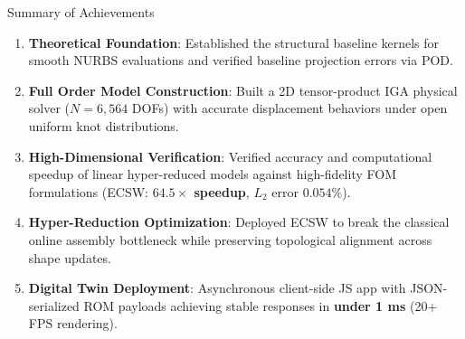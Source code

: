 
\begin{frame}{Summary of Achievements}
  \small
  \begin{enumerate}
    \setlength{\itemsep}{3pt}
    \item \textbf{Theoretical Foundation}: Established the structural baseline kernels for smooth NURBS evaluations and verified baseline projection errors via POD.
    \item \textbf{Full Order Model Construction}: Built a 2D tensor-product IGA physical solver ($N=6{,}564$ DOFs) with accurate displacement behaviors under open uniform knot distributions.
    \item \textbf{High-Dimensional Verification}: Verified accuracy and computational speedup of linear hyper-reduced models against high-fidelity FOM formulations (ECSW: \textbf{$64.5\times$ speedup}, $L_2$ error $0.054\%$).
    \item \textbf{Hyper-Reduction Optimization}: Deployed ECSW to break the classical online assembly bottleneck while preserving topological alignment across shape updates.
    \item \textbf{Digital Twin Deployment}: Asynchronous client-side JS app with JSON-serialized ROM payloads achieving stable responses in \textbf{under 1 ms} (20+ FPS rendering).
  \end{enumerate}
\end{frame}

